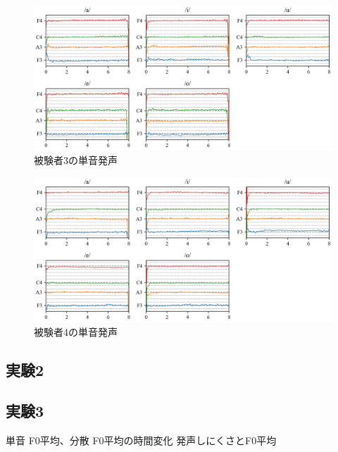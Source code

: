 \documentclass[10ptj,a4j,dvipdfmx,uplatex, oneside, openany]{jsbook}%
\begin{document}
\begin{figure}[htbp]
    \begin{center}
      \includegraphics[clip,width=16.0cm]{F0_long_3.png}
      \caption{被験者3の単音発声}
      \label{fig:3}
    \end{center}

\end{figure}

\begin{figure}[htbp]
    \begin{center}
      \includegraphics[clip,width=16.0cm]{F0_long_4.png}
      \caption{被験者4の単音発声}
      \label{fig:4}
    \end{center}
\end{figure}



\subsection{実験2}


\subsection{実験3}


単音
F0平均、分散
F0平均の時間変化
発声しにくさとF0平均
\end{document}
